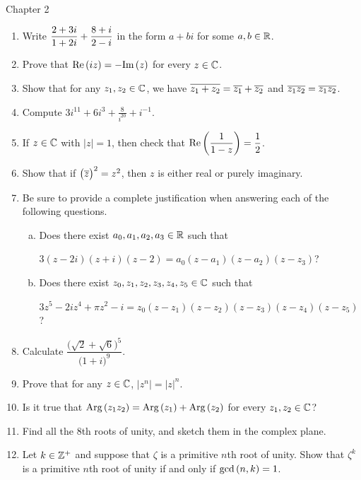 \documentclass[11pt,fleqn,dvipsnames,usenames]{article}
\begin{document}
{\huge Chapter 2}
\vsp

\begin{enumerate}
\item Write $\displaystyle{\frac{2 + 3i}{1 + 2i} + \frac{8+i}{2-i}}$ in the form $a+bi$ for some $a,b\in\mathbb{R}$.
\item Prove that $\text{Re}\left(iz\right) = -\text{Im}\left(z\right)$ for every $z\in\mathbb{C}$.
\item Show that for any $z_{1},z_{2}\in\mathbb{C}$, we have $\overline{z_{1} + z_{2}} = \overline{z_{1}} + \overline{z_{2}}$ and $\overline{z_{1}z_{2}} = \overline{z_{1}}\overline{z_{2}}$.
\item Compute $3i^{11} + 6i^{3} + \frac{8}{i^{20}} + i^{-1}$.
\item If $z\in\mathbb{C}$ with $|z| = 1$, then check that $\text{Re}\left(\dfrac{1}{1-z}\right) = \dfrac{1}{2}$.
\item Show that if $\big(\overline{z}\big)^2 = z^2$, then $z$ is either real or purely imaginary.
\item Be sure to provide a complete justification when answering each of the following questions.
\begin{enumerate}[(a)]
\item Does there exist $a_{0},a_{1},a_{2},a_{3}\in \mathbb{R}$ such that
\begin{center}
$3(z-2i)(z+i)(z-2) = a_{0}(z-a_{1})(z - a_{2})(z - z_{3})$?
\end{center}
\item Does there exist $z_{0},z_{1},z_{2},z_{3},z_{4},z_{5}\in \mathbb{C}$ such that
\begin{center}
$3z^5 - 2iz^4 + \pi z^2 - i = z_{0}(z - z_{1})(z - z_{2})(z - z_{3})(z - z_{4})(z - z_{5})$?
\end{center}
\end{enumerate}
\item Calculate $\dfrac{\big(\sqrt{2} + \sqrt{6}\big)^5}{\big(1+i\big)^9}$.
\item Prove that for any $z\in\mathbb{C}$, $|z^{n}| = |z|^{n}$.
\item Is it true that $\text{Arg}\left(z_1z_2\right) = \text{Arg}\left(z_1\right) + \text{Arg}\left(z_2\right)$ for every $z_{1},z_{2}\in\mathbb{C}$?
\item Find all the $8$th roots of unity, and sketch them in the complex plane.
\item Let $k\in\mathbb{Z}^{+}$ and suppose that $\zeta$ is a primitive $n$th root of unity.  Show that $\zeta^{k}$ is a primitive $n$th root of unity if and only if $\text{gcd}\left(n,k\right) = 1$.
\end{enumerate}
\vsp

\end{document}
